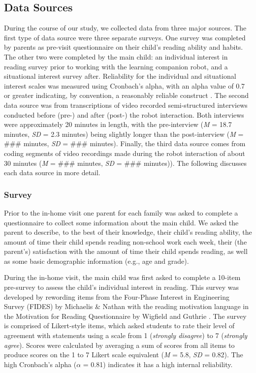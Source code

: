 \documentclass{sigchi}
\begin{document}
\subsection{Data Sources}
  During the course of our study, we collected data from three major sources. The first type of data source were three separate surveys. One survey was completed by parents as pre-visit questionnaire on their child's reading ability and habits. The other two were completed by the main child: an individual interest in reading survey prior to working with the learning companion robot, and a situational interest survey after. Reliability for the individual and situational interest scales was measured using Cronbach's alpha, with an alpha value of 0.7 or greater indicating, by convention, a reasonably reliable construct \cite{Crocker:2009}. The second data source was from transcriptions of video recorded semi-structured interviews conducted before (pre-) and after (post-) the robot interaction. Both interviews were approximately 20 minutes in length, with the pre-interview (\textit{M} = 18.7 minutes, \textit{SD} = 2.3 minutes) being slightly longer than the post-interview (\textit{M} = \#\#\# minutes, \textit{SD} = \#\#\# minutes). Finally, the third data source comes from coding segments of video recordings made during the robot interaction of about 30 minutes (\textit{M} = \#\#\# minutes, \textit{SD} = \#\#\# minutes)). The following discusses each data source in more detail.
  
\subsubsection{Survey}

  Prior to the in-home visit one parent for each family was asked to complete a questionnaire to collect some information about the main child. We asked the parent to describe, to the best of their knowledge, their child's reading ability, the amount of time their child spends reading non-school work each week, their (the parent's) satisfaction with the amount of time their child spends reading, as well as some basic demographic information (e.g., age and grade).
 
  During the in-home visit, the main child was first asked to complete a 10-item pre-survey to assess the child's individual interest in reading. This survey was developed by rewording items from the Four-Phase Interest in Engineering Survey (FIDES) by Michaelis \& Nathan \cite{Michaelis:2015} with the reading motivation language in the Motivation for Reading Questionnaire by Wigfield and Guthrie \cite{Wigfield:1997}. The survey is comprised of Likert-style items, which asked students to rate their level of agreement with statements using a scale from 1 (\textit{strongly disagree}) to 7 (\textit{strongly agree}). Scores were calculated by averaging a sum of scores from all items to produce scores on the 1 to 7 Likert scale equivalent (\textit{M} = 5.8, \textit{SD} = 0.82). The high Cronbach's alpha ($\alpha$ = 0.81) indicates it has a high internal reliability.
 
\end{document}
